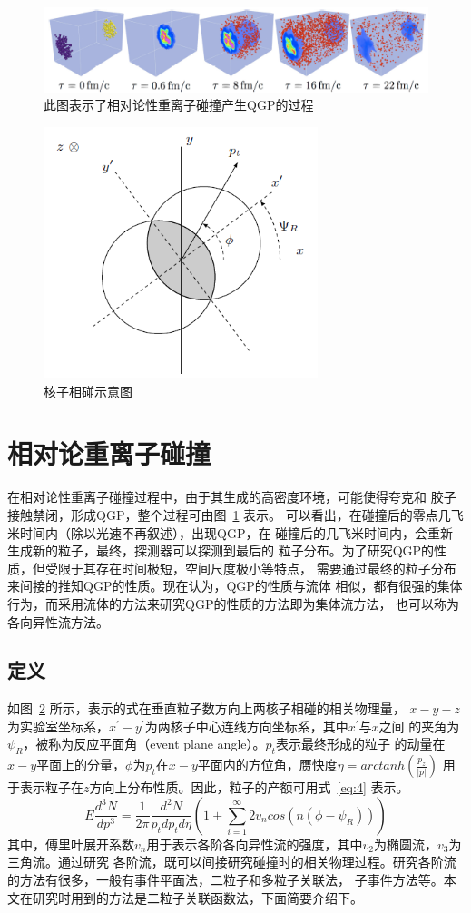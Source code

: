 \documentclass[aps,pre,12pt,preprint,onecolumn,showpacs,showkeys]{revtex4-1}
\begin{document}
\begin{figure}[t]
\centering
\includegraphics[width=140mm]{QGP}
\caption{\label{fig:QGP}%
此图表示了相对论性重离子碰撞产生QGP的过程}
\end{figure}
\begin{figure}[t]
\centering
\includegraphics[width=80mm]{hz}
\caption{\label{fig:hz}%
核子相碰示意图}
\end{figure}
\section{相对论重离子碰撞}
在相对论性重离子碰撞过程中，由于其生成的高密度环境，可能使得夸克和
胶子接触禁闭，形成QGP，整个过程可由图~\ref{fig:QGP} 表示\cite{2013PhDT........31Q}。
可以看出，在碰撞后的零点几飞米时间内（除以光速不再叙述），出现QGP，在
碰撞后的几飞米时间内，会重新生成新的粒子，最终，探测器可以探测到最后的
粒子分布。为了研究QGP的性质，但受限于其存在时间极短，空间尺度极小等特点，
需要通过最终的粒子分布来间接的推知QGP的性质。现在认为，QGP的性质与流体
相似，都有很强的集体行为，而采用流体的方法来研究QGP的性质的方法即为集体流方法，
也可以称为各向异性流方法\cite{2010LanB...23..240H}。
\subsection{定义}
如图~\ref{fig:hz} 所示，表示的式在垂直粒子数方向上两核子相碰的相关物理量，
$x-y-z$为实验室坐标系，$x^{'}-y^{'}$为两核子中心连线方向坐标系，其中$x^{'}$与$x$之间
的夹角为$\psi_{R}$，被称为反应平面角（event plane angle）。$p_{t}$表示最终形成的粒子
的动量在$x-y$平面上的分量，$\phi$为$p_{t}$在$x-y$平面内的方位角，赝快度$\eta=arctanh(\frac{p_{z}}{|p|})$
用于表示粒子在$z$方向上分布性质。因此，粒子的产额可用式~\ref{eq:4} 表示\cite{PhysRevC.58.1671}。
\begin{equation}
E\frac{d^{3}N}{dp^{3}}=\frac{1}{2\pi}\frac{d^{2}N}{p_{t}dp_{t}d\eta}(1+\sum_{i=1}^{\infty}2v_{n}cos(n(\phi-\psi_{R}))) \label{eq:4}
\end{equation}
其中，傅里叶展开系数$v_{n}$用于表示各阶各向异性流的强度，其中$v_{2}$为椭圆流，$v_{3}$为三角流。通过研究
各阶流，既可以间接研究碰撞时的相关物理过程。研究各阶流的方法有很多，一般有事件平面法，二粒子和多粒子关联法，
子事件方法等。本文在研究时用到的方法是二粒子关联函数法，下面简要介绍下。
\end{document}
